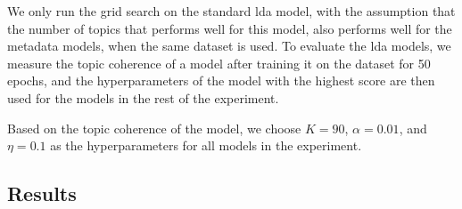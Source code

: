 We only run the grid search on the standard \gls{lda} model, with the assumption that the number of topics that performs well for this model, also performs well for the metadata models, when the same dataset is used.
To evaluate the \gls{lda} models, we measure the topic coherence of a model after training it on the dataset for 50 epochs, and the hyperparameters of the model with the highest score are then used for the models in the rest of the experiment.

Based on the topic coherence of the model, we choose $K = 90$, $\alpha = 0.01$, and $\eta = 0.1$ as the hyperparameters for all models in the experiment.



\subsection{Results}\label{sec:results}


